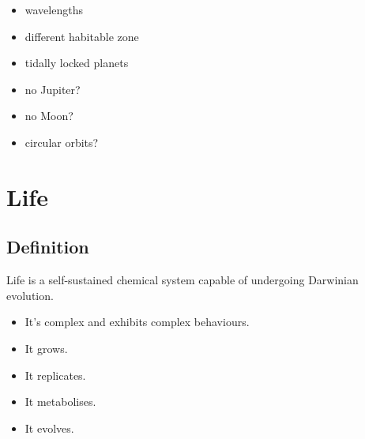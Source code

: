 \documentclass{article}
\theoremstyle{sltheorem}
\begin{document}
\begin{itemize}
    \item wavelengths
    \item different habitable zone
    \item tidally locked planets
    \item no Jupiter?
    \item no Moon?
    \item circular orbits?
\end{itemize}
\section{Life}
\subsection{Definition}
Life is a self-sustained chemical system capable of undergoing Darwinian evolution.
\begin{itemize}
    \item It's complex and exhibits complex behaviours.
    \item It grows.
    \item It replicates.
    \item It metabolises.
    \item It evolves.
\end{itemize}
\end{document}
